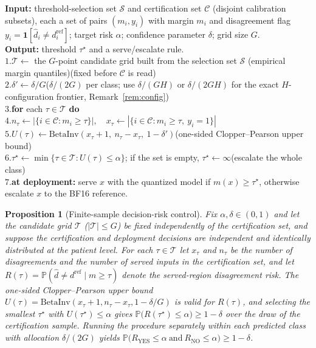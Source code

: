 \documentclass[11pt]{article}
\theoremstyle{plain}
\newtheorem{proposition}{Proposition}
\newcommand{\YES}{\mathrm{YES}}
\newcommand{\NO}{\mathrm{NO}}
\newcommand{\Prob}{\mathbb{P}}
\newcommand{\Risk}{R}
\begin{document}
\begin{algorithm}[t]
\caption{\textbf{CERTA certify-or-escalate calibration} (one decision class; run once per class for the
class-conditional variant).}
\label{alg:certa}
\small
\begin{flushleft}
\textbf{Input:} threshold-selection set $\mathcal{S}$ and certification set $\mathcal{C}$ (disjoint
calibration subsets), each a set of pairs $(m_i,y_i)$ with margin $m_i$ and disagreement flag
$y_i=\mathbf{1}[\hat d_i\neq d^{\mathrm{ref}}_i]$; target risk $\alpha$; confidence parameter $\delta$; grid size $G$.\\
\textbf{Output:} threshold $\tau^\star$ and a serve/escalate rule.\\[0.35em]
$1.$\quad $\mathcal{T}\leftarrow$ the $G$-point candidate grid built from the selection set $\mathcal{S}$ (empirical margin quantiles)\hfill(fixed before $\mathcal{C}$ is read)\\
$2.$\quad $\delta'\leftarrow \delta/G$\hfill($\delta/(2G)$ per class; use $\delta/(GH)$ or $\delta/(2GH)$ for the exact $H$-configuration frontier, Remark~\ref{rem:config})\\
$3.$\quad \textbf{for} each $\tau\in\mathcal{T}$ \textbf{do}\\
$4.$\quad\quad $n_\tau\leftarrow|\{i\in\mathcal{C}:m_i\ge\tau\}|,\quad x_\tau\leftarrow|\{i\in\mathcal{C}:m_i\ge\tau,\ y_i=1\}|$\\
$5.$\quad\quad $U(\tau)\leftarrow \mathrm{BetaInv}(x_\tau+1,\ n_\tau-x_\tau,\ 1-\delta')$\hfill(one-sided Clopper--Pearson upper bound)\\
$6.$\quad $\tau^\star\leftarrow \min\{\tau\in\mathcal{T}:U(\tau)\le\alpha\}$; if the set is empty, $\tau^\star\leftarrow\infty$\hfill(escalate the whole class)\\
$7.$\quad \textbf{at deployment:} serve $x$ with the quantized model if $m(x)\ge\tau^\star$, otherwise escalate $x$ to the BF16 reference.
\end{flushleft}
\end{algorithm}

\begin{proposition}[Finite-sample decision-risk control]\label{prop:cert}
Fix $\alpha,\delta\in(0,1)$ and let the candidate grid $\mathcal{T}$ ($|\mathcal{T}|\le G$) be fixed
independently of the certification set, and suppose the certification and deployment decisions are
independent and identically distributed at the patient level. For each $\tau\in\mathcal{T}$ let $x_\tau$ and $n_\tau$ be the number of disagreements and
the number of served inputs in the certification set, and let
$\Risk(\tau)=\Prob(\hat d\neq d^{\mathrm{ref}}\mid m\ge\tau)$ denote the served-region disagreement risk.
The one-sided Clopper--Pearson upper bound $U(\tau)=\mathrm{BetaInv}(x_\tau+1,n_\tau-x_\tau,1-\delta/G)$ is
valid for $\Risk(\tau)$, and selecting the smallest $\tau^\star$ with $U(\tau^\star)\le\alpha$ gives
$\Prob\big(\Risk(\tau^\star)\le\alpha\big)\ge 1-\delta$ over the draw of the certification sample.
Running the procedure separately within each predicted class with allocation $\delta/(2G)$ yields
$\Prob\big(\Risk_{\YES}\le\alpha \ \text{and}\ \Risk_{\NO}\le\alpha\big)\ge 1-\delta$.
\end{proposition}
\end{document}
